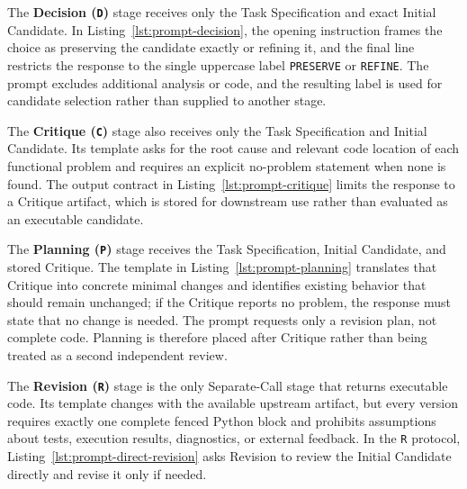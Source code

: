 The \textbf{Decision (\texttt{D})} stage receives only the Task Specification and exact Initial Candidate.
In Listing~\ref{lst:prompt-decision}, the opening instruction frames the choice as preserving the candidate exactly or refining it, and the final line restricts the response to the single uppercase label \texttt{PRESERVE} or \texttt{REFINE}.
The prompt excludes additional analysis or code, and the resulting label is used for candidate selection rather than supplied to another stage.

\noindent\begin{minipage}{\columnwidth}

\end{minipage}

The \textbf{Critique (\texttt{C})} stage also receives only the Task Specification and Initial Candidate.
Its template asks for the root cause and relevant code location of each functional problem and requires an explicit no-problem statement when none is found.
The output contract in Listing~\ref{lst:prompt-critique} limits the response to a Critique artifact, which is stored for downstream use rather than evaluated as an executable candidate.

\noindent\begin{minipage}{\columnwidth}

\end{minipage}

The \textbf{Planning (\texttt{P})} stage receives the Task Specification, Initial Candidate, and stored Critique.
The template in Listing~\ref{lst:prompt-planning} translates that Critique into concrete minimal changes and identifies existing behavior that should remain unchanged; if the Critique reports no problem, the response must state that no change is needed.
The prompt requests only a revision plan, not complete code.
Planning is therefore placed after Critique rather than being treated as a second independent review.

\noindent\begin{minipage}{\columnwidth}

\end{minipage}

The \textbf{Revision (\texttt{R})} stage is the only Separate-Call stage that returns executable code.
Its template changes with the available upstream artifact, but every version requires exactly one complete fenced Python block and prohibits assumptions about tests, execution results, diagnostics, or external feedback.
In the \texttt{R} protocol, Listing~\ref{lst:prompt-direct-revision} asks Revision to review the Initial Candidate directly and revise it only if needed.

